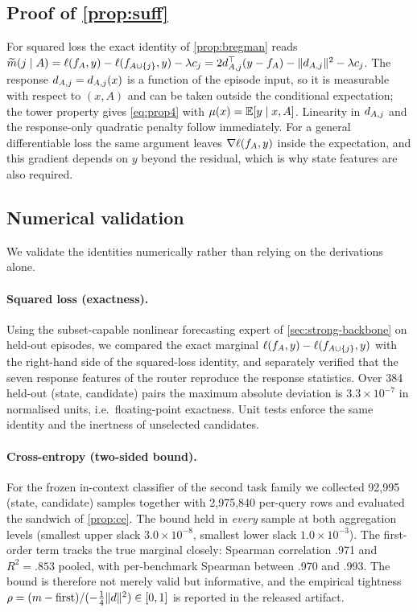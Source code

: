 \subsection{Proof of \cref{prop:suff}}
For squared loss the exact identity of \cref{prop:bregman} reads
$\widetilde{m}(j\mid A)
=\ell(f_A,y)-\ell(f_{A\cup\{j\}},y)-\lambda c_j
=2d_{A,j}^\top(y-f_A)-\|d_{A,j}\|^2-\lambda c_j$.
The response $d_{A,j}=d_{A,j}(x)$ is a function of the episode input, so it is
measurable with respect to $(x,A)$ and can be taken outside the conditional
expectation; the tower property gives \cref{eq:prop4} with
$\mu(x)=\mathbb{E}[y\mid x,A]$. Linearity in $d_{A,j}$ and the response-only quadratic
penalty follow immediately. For a general differentiable loss the same
argument leaves $\nabla\ell(f_A,y)$ inside the expectation, and this gradient
depends on $y$ beyond the residual, which is why state features are also
required.

\subsection{Numerical validation}
\label{app:validation}
We validate the identities numerically rather than relying on the derivations
alone.

\paragraph{Squared loss (exactness).}
Using the subset-capable nonlinear forecasting expert of
\cref{sec:strong-backbone} on held-out episodes, we compared the exact
marginal $\ell(f_A,y)-\ell(f_{A\cup\{j\}},y)$ with the right-hand side of the
squared-loss identity, and separately verified that the seven response
features of the router reproduce the response statistics. Over 384 held-out
(state, candidate) pairs the maximum absolute deviation is $3.3\times10^{-7}$
in normalised units, i.e.\ floating-point exactness. Unit tests enforce the
same identity and the inertness of unselected candidates.

\paragraph{Cross-entropy (two-sided bound).}
For the frozen in-context classifier of the second task family we collected
92{,}995 (state, candidate) samples together with 2{,}975{,}840 per-query rows
and evaluated the sandwich of \cref{prop:ce}. The bound held in
\emph{every} sample at both aggregation levels (smallest upper slack
$3.0\times10^{-8}$, smallest lower slack $1.0\times10^{-3}$). The first-order
term tracks the true marginal closely: Spearman correlation .971 and
$R^2=.853$ pooled, with per-benchmark Spearman between .970 and .993. The
bound is therefore not merely valid but informative, and the empirical
tightness $\rho=(m-\text{first})/(-\tfrac14\|d\|^2)\in[0,1]$ is
reported in the released artifact.


